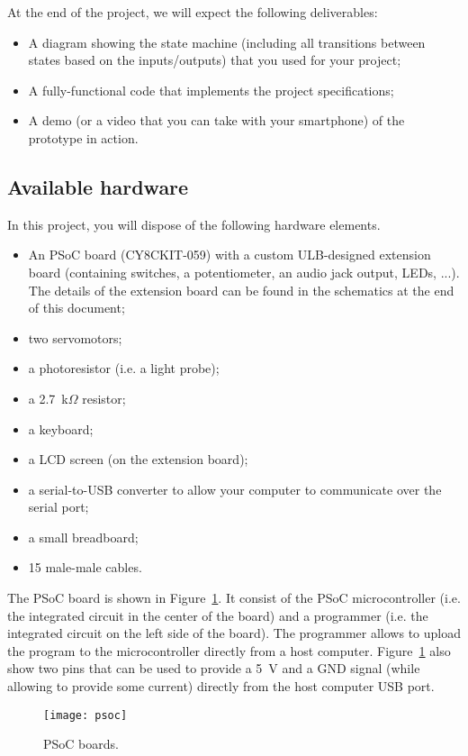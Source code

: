 At the end of the project, we will expect the following deliverables: 
\begin{itemize}
	\item A diagram showing the state machine (including all transitions between states based on the inputs/outputs) that you used for your project; 
	\item A fully-functional code that implements the project specifications; 
	\item A demo (or a video that you can take with your smartphone) of the prototype in action. 
\end{itemize}



\subsection{Available hardware}

In this project, you will dispose of the following hardware elements. 
\begin{itemize}
	\item An PSoC board (CY8CKIT-059) with a custom ULB-designed extension board (containing switches, a potentiometer, an audio jack output,  LEDs, ...). The details of the extension board can be found in the schematics at the end of this document; 
	\item two servomotors; 
	\item a photoresistor (i.e. a light probe); 
	\item a 2.7~k$\Omega$ resistor; 
	\item a keyboard; 
	\item a LCD screen (on the extension board); 
	\item a serial-to-USB converter to allow your computer to communicate over the serial port; 
	\item a small breadboard;  
	\item 15 male-male cables. 
\end{itemize}
The PSoC board is shown in Figure~\ref{fig:psoc}. It consist of the PSoC microcontroller (i.e. the integrated circuit in the center of the board) and a programmer (i.e. the integrated circuit on the left side of the board). The programmer allows to upload the program to the microcontroller directly from a host computer. Figure~\ref{fig:psoc} also show two pins that can be used to provide a 5~V and a GND signal (while allowing to provide some current) directly from the host computer USB port. 
\begin{figure}
	\centering
	\texttt{[image: psoc]}
	\caption{PSoC boards. }
	\label{fig:psoc}
\end{figure}
